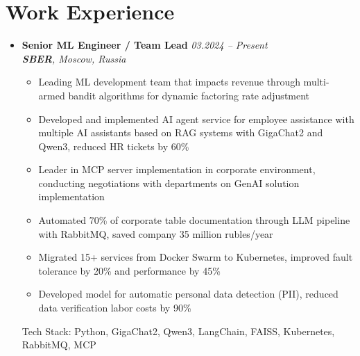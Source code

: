 \documentclass[letterpaper,11pt]{article}
\begin{document}
\section{Work Experience}

\begin{itemize}[leftmargin=0.15in, label={}]
    \item \textbf{Senior ML Engineer / Team Lead} \hfill \textit{03.2024 -- Present} \\
    \textit{\textbf{SBER}, Moscow, Russia} \\
    \vspace{-10pt}
    \begin{itemize}
        \item Leading ML development team that impacts revenue through multi-armed bandit algorithms for dynamic factoring rate adjustment
        \item Developed and implemented AI agent service for employee assistance with multiple AI assistants based on RAG systems with GigaChat2 and Qwen3, reduced HR tickets by 60\%
        \item Leader in MCP server implementation in corporate environment, conducting negotiations with departments on GenAI solution implementation
        \item Automated 70\% of corporate table documentation through LLM pipeline with RabbitMQ, saved company 35 million rubles/year
        \item Migrated 15+ services from Docker Swarm to Kubernetes, improved fault tolerance by 20\% and performance by 45\%
        \item Developed model for automatic personal data detection (PII), reduced data verification labor costs by 90\%
    \end{itemize}
    \vspace{-10pt}
    Tech Stack: Python, GigaChat2, Qwen3, LangChain, FAISS, Kubernetes, RabbitMQ, MCP
    \vspace{-5pt}


\end{itemize}
\end{document}
